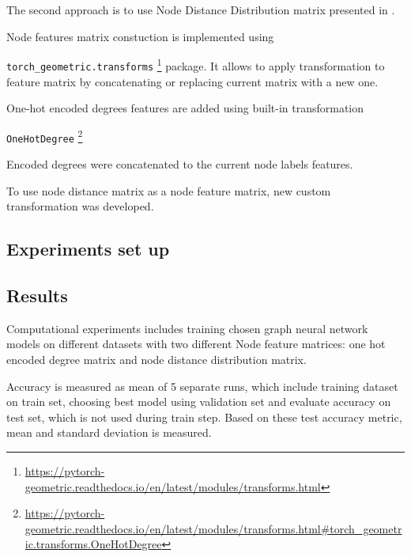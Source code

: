 
The second approach is to use Node Distance Distribution matrix presented in \cite{Netpro2vec}.





Node features matrix constuction is implemented using

\texttt{torch\_geometric.transforms} \footnote{\url{https://pytorch-geometric.readthedocs.io/en/latest/modules/transforms.html}}
package. It allows to apply transformation to feature matrix by concatenating or replacing current matrix with a new one.

One-hot encoded degrees features are added using built-in transformation

\texttt{OneHotDegree}
\footnote{\url{https://pytorch-geometric.readthedocs.io/en/latest/modules/transforms.html\#torch_geometric.transforms.OneHotDegree}}

Encoded degrees were concatenated to the current node labels features.

To use node distance matrix as a node feature matrix, new custom transformation was developed.


\subsection{Experiments set up}




\subsection{Results}

Computational experiments includes training chosen graph neural network models on different datasets with two different
Node feature matrices: one hot encoded degree matrix and node distance distribution matrix.

Accuracy is measured as mean of 5 separate runs, which include training dataset on train set, choosing
best model using validation set and evaluate accuracy on test set, which is not used during train step.
Based on these test accuracy metric, mean and standard deviation is measured.

